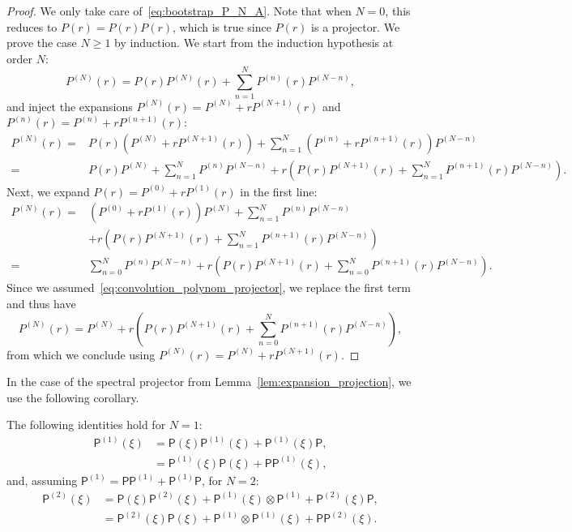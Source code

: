 \documentclass[10pt]{amsart}
\theoremstyle{definition}\newtheorem{defi}[theo]{Definition}\newtheorem{rema}[theo]{Remark}\newtheorem{exam}[theo]{Example}\newtheorem{exem}[theo]{Example}\newtheorem{nota}[theo]{Notation}
\newcommand{\PP}{\mathsf{P}}
\renewcommand*\ge{\geqslant}
\begin{document}
\begin{proof}
We only take care of~\eqref{eq:bootstrap_P_N_A}. Note that when $N=0$, this reduces to $P(r) = P(r) P(r)$, which is true since $P(r)$ is a projector. We prove the case $N \ge 1$ by induction. We start from the induction hypothesis at order $N$:
\[
P^{(N)}(r) = P(r) P^{(N)}(r) + \sum_{n=1}^{N} P^{(n)} (r) P^{(N-n)},
\]
and inject the expansions $P^{(N)}(r) = P^{(N)} + r P^{(N+1)}(r)$ and $P^{(n)}(r) = P^{(n)} + r P^{(n+1)}(r)$:
\begin{align*}
P^{(N)}(r) = & P(r) \left(P^{(N)} + r P^{(N+1)}(r) \right) + \sum_{n=1}^{N} \left(P^{(n)} + r P^{(n+1)}(r)\right) P^{(N-n)} \\
=& P(r) P^{(N)} + \sum_{n=1}^{N} P^{(n)} P^{(N-n)} + r \left(P(r) P^{(N+1)}(r) + \sum_{n=1}^{N} P^{(n+1)}(r) P^{(N-n)} \right).
\end{align*}
Next, we expand $P(r) = P^{(0)} + r P^{(1)}(r)$ in the first line:
\begin{align*}
P^{(N)}(r) =& \left(P^{(0)} + r P^{(1)}(r) \right) P^{(N)} + \sum_{n=1}^{N} P^{(n)} P^{(N-n)} \\
&+ r \left(P(r) P^{(N+1)}(r) + \sum_{n=1}^{N} P^{(n+1)}(r) P^{(N-n)} \right) \\
= & \sum_{n=0}^{N} P^{(n)} P^{(N-n)} + r \left(P(r) P^{(N+1)}(r) + \sum_{n=0}^{N} P^{(n+1)}(r) P^{(N-n)} \right).
\end{align*}
Since we assumed~\eqref{eq:convolution_polynom_projector}, we replace the first term and thus have
\[
P^{(N)}(r) = P^{(N)} + r \left(P(r) P^{(N+1)}(r) + \sum_{n=0}^{N} P^{(n+1)}(r) P^{(N-n)} \right),
\]
from which we conclude using $P^{(N)}(r) = P^{(N)} + r P^{(N+1)}(r)$.
\end{proof}

In the case of the spectral projector from Lemma~\ref{lem:expansion_projection}, we use the following corollary.
\begin{coro}
The following identities hold for $N=1$:
\begin{align}
\PP^{(1)}(\xi) & = \PP(\xi) \PP^{(1)}(\xi) + \PP^{(1)}(\xi) \PP,\label{eq:bootstrap_P_1_A}\\
& = \PP^{(1)}(\xi) \PP(\xi) + \PP \PP^{(1)}(\xi),\label{eq:bootstrap_P_1_B}
\end{align}
and, assuming $\PP^{(1)} = \PP \PP^{(1)} + \PP^{(1)} \PP$, for $N=2$:
\begin{align}
\PP^{(2)}(\xi) & = \PP(\xi) \PP^{(2)}(\xi) + \PP^{(1)}(\xi) \otimes \PP^{(1)} + \PP^{(2)}(\xi) \PP,\label{eq:bootstrap_P_2_A}\\
& = \PP^{(2)}(\xi) \PP(\xi) + \PP^{(1)} \otimes \PP^{(1)}(\xi) + \PP \PP^{(2)}(\xi).\label{eq:bootstrap_P_2_B}
\end{align}
\end{coro}
\end{document}
